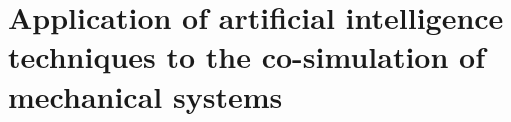 
\section{Application of artificial intelligence techniques to the co-simulation of mechanical systems}

